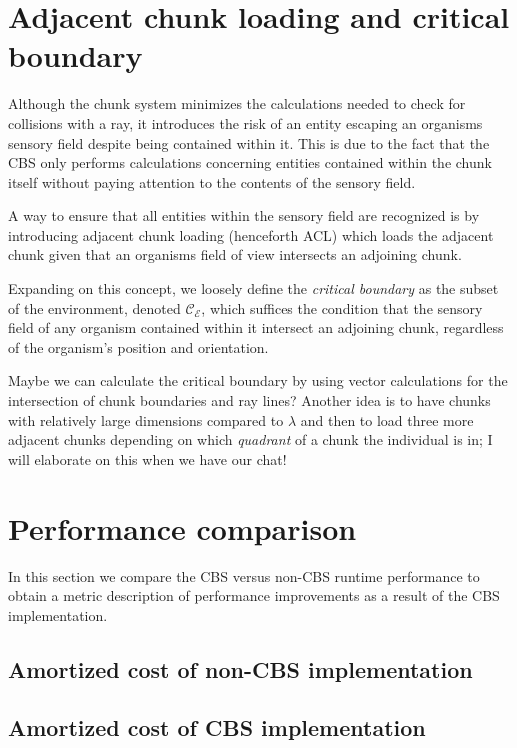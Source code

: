 \documentclass[a4paper, 12pt]{report}
\theoremstyle{definition}
\begin{document}
\section{Adjacent chunk loading and critical boundary}
Although the chunk system minimizes the calculations needed to check for collisions with a ray, it introduces the risk of an entity
escaping an organisms sensory field despite being contained within it. This is due to the fact that the CBS only performs calculations
concerning entities contained within the chunk itself without paying attention to the contents of the sensory field.
\par A way to ensure that all entities within the sensory field are recognized is by introducing adjacent chunk loading (henceforth ACL)
which loads the adjacent chunk given that an organisms field of view intersects an adjoining chunk.
\par Expanding on this concept, we loosely define the \emph{critical boundary} as the subset of the environment, denoted $\mathcal C_{\mathscr E}$,
which suffices the condition that the sensory field of any organism contained within it intersect an adjoining chunk, regardless of the organism's position
and orientation.

\par Maybe we can calculate the critical boundary by using vector calculations for the intersection of chunk boundaries and ray lines?
Another idea is to have chunks with relatively large dimensions compared to $\lambda$ and then to load three more adjacent chunks depending on
which \emph{quadrant} of a chunk the individual is in; I will elaborate on this when we have our chat!

\section{Performance comparison}
In this section we compare the CBS versus non-CBS runtime performance to obtain a metric description
of performance improvements as a result of the CBS implementation.

\subsection{Amortized cost of non-CBS implementation}

\subsection{Amortized cost of CBS implementation}
\end{document}
